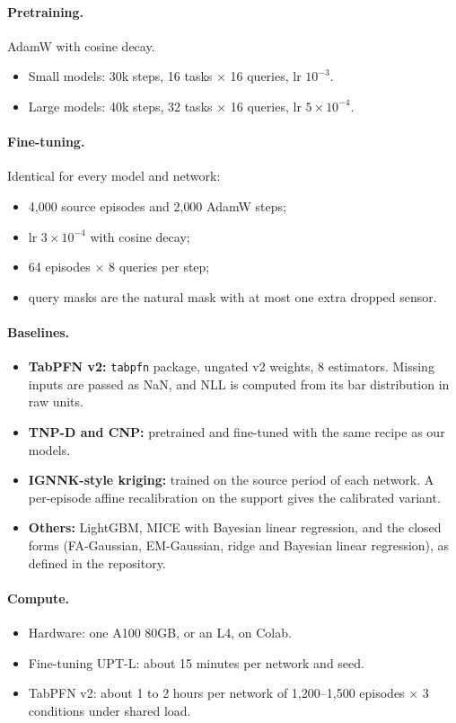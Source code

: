 \paragraph{Pretraining.} AdamW with cosine decay.
\begin{itemize}
  \item Small models: 30k steps, 16 tasks $\times$ 16 queries, lr $10^{-3}$.
  \item Large models: 40k steps, 32 tasks $\times$ 16 queries, lr $5\times10^{-4}$.
\end{itemize}

\paragraph{Fine-tuning.} Identical for every model and network:
\begin{itemize}
  \item 4{,}000 source episodes and 2{,}000 AdamW steps;
  \item lr $3\times10^{-4}$ with cosine decay;
  \item 64 episodes $\times$ 8 queries per step;
  \item query masks are the natural mask with at most one extra dropped sensor.
\end{itemize}

\paragraph{Baselines.}
\begin{itemize}
  \item \textbf{TabPFN v2:} \texttt{tabpfn} package, ungated v2 weights, 8 estimators. Missing inputs are passed as NaN, and
  NLL is computed from its bar distribution in raw units.
  \item \textbf{TNP-D and CNP:} pretrained and fine-tuned with the same recipe as our models.
  \item \textbf{IGNNK-style kriging:} trained on the source period of each network. A per-episode affine recalibration on the
  support gives the calibrated variant.
  \item \textbf{Others:} LightGBM, MICE with Bayesian linear regression, and the closed forms (FA-Gaussian, EM-Gaussian, ridge
  and Bayesian linear regression), as defined in the repository.
\end{itemize}

\paragraph{Compute.}
\begin{itemize}
  \item Hardware: one A100 80GB, or an L4, on Colab.
  \item Fine-tuning UPT-L: about 15 minutes per network and seed.
  \item TabPFN v2: about 1 to 2 hours per network of 1{,}200--1{,}500 episodes $\times$ 3 conditions under shared load.
\end{itemize}

